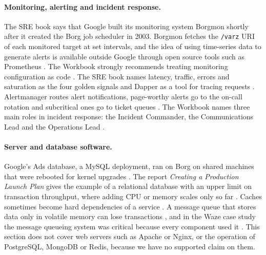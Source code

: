 \paragraph{Monitoring, alerting and incident response.}
The SRE book says that Google built its monitoring system Borgmon shortly after it created the Borg job scheduler in 2003. Borgmon fetches the \texttt{/varz} URI of each monitored target at set intervals, and the idea of using time-series data to generate alerts is available outside Google through open source tools such as Prometheus \cite{sre-book}. The Workbook strongly recommends treating monitoring configuration as code \cite{workbook}. The SRE book names latency, traffic, errors and saturation as the four golden signals and Dapper as a tool for tracing requests \cite{sre-book}. Alertmanager routes alert notifications, page-worthy alerts go to the on-call rotation and subcritical ones go to ticket queues \cite{sre-book}. The Workbook names three main roles in incident response: the Incident Commander, the Communications Lead and the Operations Lead \cite{workbook}.

\paragraph{Server and database software.}
Google's Ads database, a MySQL deployment, ran on Borg on shared machines that were rebooted for kernel upgrades \cite{sre-book}. The report \textit{Creating a Production Launch Plan} gives the example of a relational database with an upper limit on transaction throughput, where adding CPU or memory scales only so far \cite{static-pdf-creatingproductionlaunchplan-pdf}. Caches sometimes become hard dependencies of a service \cite{sre-book}. A message queue that stores data only in volatile memory can lose transactions \cite{bsrs}, and in the Waze case study the message queueing system was critical because every component used it \cite{workbook}. This section does not cover web servers such as Apache or Nginx, or the operation of PostgreSQL, MongoDB or Redis, because we have no supported claim on them.

